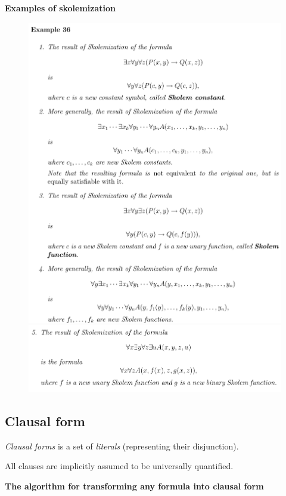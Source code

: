 \documentclass[10pt,a4paper]{article}
\begin{document}
\textbf{Examples of skolemization}
\begin{figure}[H]
\includegraphics[scale=0.6]{./figures/skolemex1.pdf}
\includegraphics[scale=0.6]{./figures/skolemex2.pdf}
\end{figure}


\subsection{Clausal form}

\textit{Clausal forms} \cite[p. 62]{LecPartII} is a set of \textit{literals} (representing their disjunction).

All clauses are implicitly assumed to be universally quantified.

\textbf{The algorithm for transforming any formula into clausal form}
\end{document}
